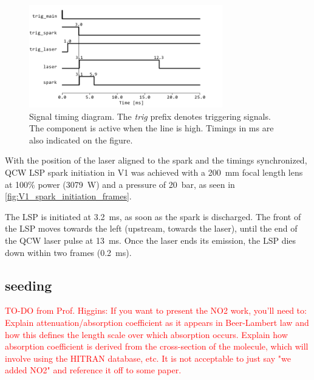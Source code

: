             \begin{figure}[!ht]
                \centering
                \includegraphics[width=0.75\textwidth]{assets/4 experiments/timings.pdf}
                \caption{Signal timing diagram. The \textit{trig} prefix denotes triggering signals. The component is active when the line is high. Timings in \unit{ms} are also indicated on the figure.}
                \label{fig: Signal timing diagram}
            \end{figure}

            With the position of the laser aligned to the spark and the timings synchronized, QCW LSP spark initiation in V1 was achieved with a \qty{200}{mm} focal length lens at 100\% power (\qty{3079}{W}) and a pressure of \qty{20}{bar}, as seen in \autoref{fig:V1_spark_initiation_frames}.
            
            
            
            The LSP is initiated at \qty{3.2}{ms}, as soon as the spark is discharged. The front of the LSP moves towards the left (upstream, towards the laser), until the end of the QCW laser pulse at \qty{13}{ms}. Once the laser ends its emission, the LSP dies down within two frames (\qty{0.2}{ms}).

        \subsection{ seeding}

            \textcolor{red}{TO-DO from Prof. Higgins: If you want to present the NO2 work, you'll need to: Explain attenuation/absorption coefficient as it appears in Beer-Lambert law and how this defines the length scale over which absorption occurs. Explain how absorption coefficient is derived from the cross-section of the molecule, which will involve using the HITRAN database, etc. It is not acceptable to just say "we added NO2" and reference it off to some paper.}
            

